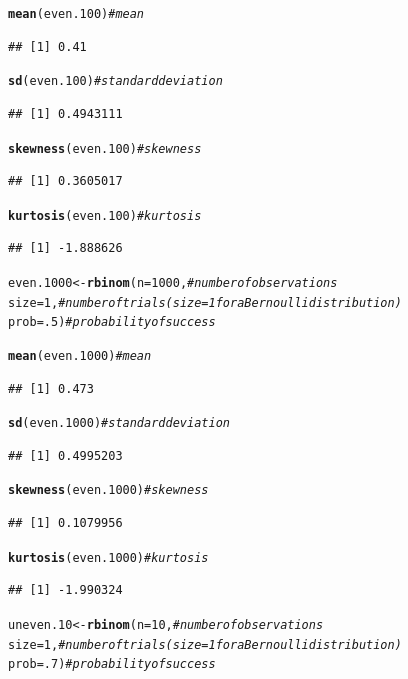 \documentclass{article}\usepackage[]{graphicx}\usepackage[]{color}
\makeatletter
\newcommand{\hlnum}[1]{\textcolor[rgb]{0.686,0.059,0.569}{#1}}%
\newcommand{\hlcom}[1]{\textcolor[rgb]{0.678,0.584,0.686}{\textit{#1}}}%
\newcommand{\hlstd}[1]{\textcolor[rgb]{0.345,0.345,0.345}{#1}}%
\newcommand{\hlkwb}[1]{\textcolor[rgb]{0.69,0.353,0.396}{#1}}%
\newcommand{\hlkwc}[1]{\textcolor[rgb]{0.333,0.667,0.333}{#1}}%
\newcommand{\hlkwd}[1]{\textcolor[rgb]{0.737,0.353,0.396}{\textbf{#1}}}%
\newenvironment{kframe}{%
 \def\at@end@of@kframe{}%
 \ifinner\ifhmode%
  \def\at@end@of@kframe{\end{minipage}}%
  \begin{minipage}{\columnwidth}%
 \fi\fi%
 \def\FrameCommand##1{\hskip\@totalleftmargin \hskip-\fboxsep
 \colorbox{shadecolor}{##1}\hskip-\fboxsep
     \hskip-\linewidth \hskip-\@totalleftmargin \hskip\columnwidth}%
 \MakeFramed {\advance\hsize-\width
   \@totalleftmargin\z@ \linewidth\hsize
   \@setminipage}}%
 {\par\unskip\endMakeFramed%
 \at@end@of@kframe}
\newenvironment{knitrout}{}{} %
\makeatother
\begin{document}
\begin{enumerate}
\begin{enumerate}
\begin{knitrout}
\begin{kframe}
\begin{alltt}
\hlkwd{mean}\hlstd{(even.100)}                   \hlcom{#mean}
\end{alltt}
\begin{verbatim}
## [1] 0.41
\end{verbatim}
\begin{alltt}
\hlkwd{sd}\hlstd{(even.100)}                     \hlcom{#standard deviation}
\end{alltt}
\begin{verbatim}
## [1] 0.4943111
\end{verbatim}
\begin{alltt}
\hlkwd{skewness}\hlstd{(even.100)}               \hlcom{#skewness}
\end{alltt}
\begin{verbatim}
## [1] 0.3605017
\end{verbatim}
\begin{alltt}
\hlkwd{kurtosis}\hlstd{(even.100)}               \hlcom{#kurtosis}
\end{alltt}
\begin{verbatim}
## [1] -1.888626
\end{verbatim}
\begin{alltt}
\hlstd{even.1000} \hlkwb{<-} \hlkwd{rbinom}\hlstd{(}\hlkwc{n}\hlstd{=}\hlnum{1000}\hlstd{,}      \hlcom{#number of observations}
              \hlkwc{size}\hlstd{=}\hlnum{1}\hlstd{,}            \hlcom{#number of trials (size=1 for a Bernoulli distribution)}
              \hlkwc{prob}\hlstd{=}\hlnum{.5}\hlstd{)}           \hlcom{#probability of success}

\hlkwd{mean}\hlstd{(even.1000)}                  \hlcom{#mean}
\end{alltt}
\begin{verbatim}
## [1] 0.473
\end{verbatim}
\begin{alltt}
\hlkwd{sd}\hlstd{(even.1000)}                    \hlcom{#standard deviation}
\end{alltt}
\begin{verbatim}
## [1] 0.4995203
\end{verbatim}
\begin{alltt}
\hlkwd{skewness}\hlstd{(even.1000)}              \hlcom{#skewness}
\end{alltt}
\begin{verbatim}
## [1] 0.1079956
\end{verbatim}
\begin{alltt}
\hlkwd{kurtosis}\hlstd{(even.1000)}              \hlcom{#kurtosis}
\end{alltt}
\begin{verbatim}
## [1] -1.990324
\end{verbatim}
\begin{alltt}
\hlstd{uneven.10} \hlkwb{<-} \hlkwd{rbinom}\hlstd{(}\hlkwc{n}\hlstd{=}\hlnum{10}\hlstd{,}        \hlcom{#number of observations}
                  \hlkwc{size}\hlstd{=}\hlnum{1}\hlstd{,}        \hlcom{#number of trials (size=1 for a Bernoulli distribution)}
                  \hlkwc{prob}\hlstd{=}\hlnum{.7}\hlstd{)}       \hlcom{#probability of success}


\end{alltt}
\end{kframe}
\end{knitrout}
\end{enumerate}
\end{enumerate}
\end{document}
